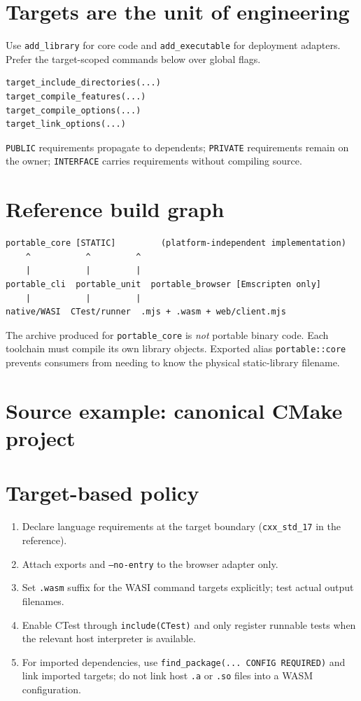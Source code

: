 \documentclass[11pt,letterpaper]{article}
\begin{document}
\frontmatterdoc
\section{Targets are the unit of engineering}
Use \texttt{add\_library} for core code and \texttt{add\_executable} for deployment adapters. Prefer the target-scoped commands below over global flags.
\begin{lstlisting}[language={}]
target_include_directories(...)
target_compile_features(...)
target_compile_options(...)
target_link_options(...)
\end{lstlisting} \texttt{PUBLIC} requirements propagate to dependents; \texttt{PRIVATE} requirements remain on the owner; \texttt{INTERFACE} carries requirements without compiling source.

\section{Reference build graph}
\begin{lstlisting}[language={},caption={Target dependency topology}]
portable_core [STATIC]         (platform-independent implementation)
    ^           ^         ^
    |           |         |
portable_cli  portable_unit  portable_browser [Emscripten only]
    |           |         |
native/WASI  CTest/runner  .mjs + .wasm + web/client.mjs
\end{lstlisting}
The archive produced for \texttt{portable\_core} is \emph{not} portable binary code. Each toolchain must compile its own library objects. Exported alias \texttt{portable::core} prevents consumers from needing to know the physical static-library filename.

\section{Source example: canonical CMake project}


\section{Target-based policy}
\begin{enumerate}
\item Declare language requirements at the target boundary (\texttt{cxx\_std\_17} in the reference).
\item Attach exports and \texttt{--no-entry} to the browser adapter only.
\item Set \texttt{.wasm} suffix for the WASI command targets explicitly; test actual output filenames.
\item Enable CTest through \texttt{include(CTest)} and only register runnable tests when the relevant host interpreter is available.
\item For imported dependencies, use \texttt{find\_package(... CONFIG REQUIRED)} and link imported targets; do not link host \texttt{.a} or \texttt{.so} files into a WASM configuration.
\end{enumerate}
\end{document}
